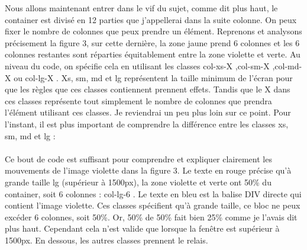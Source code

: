\documentclass{article}
\begin{document}
Nous allons maintenant entrer dans le vif du sujet, comme dit plus haut, le container est divis\'e en 12 parties que j'appellerai dans la suite colonne. On peux fixer le nombre de colonnes que peux prendre un \'el\'ement. Reprenons et analysons pr\'ecisement la figure 3, sur cette derni\`ere, la zone jaune prend 6 colonnes et les 6 colonnes restantes sont r\'eparties \'equitablement entre la zone violette et verte. Au niveau du code, on sp\'ecifie cela en utilisant les classes \og col-xs-X \fg,\og col-sm-X \fg,\og col-md-X \fg ou \og col-lg-X \fg. Xs, sm, md et lg repr\'esentent la taille minimum de l'\'ecran pour que les r\`egles que ces classes contiennent prennent effets. Tandis que le X dans ces classes repr\'esente tout simplement le nombre de colonnes que prendra l'\'el\'ement utilisant ces classes. Je reviendrai un peu plus loin sur ce point. Pour l'instant, il est plus important de comprendre la diff\'erence entre les classes xs, sm, md et lg :
\vspace{0.5cm}\\
\vspace{0.5cm}\\
Ce bout de code est suffisant pour comprendre et expliquer clairement les mouvements de l'image violette dans la figure 3. Le texte en rouge pr\'ecise qu'\`a grande taille lg (sup\'erieur \`a 1500px), la zone violette et verte ont 50\% du container, soit 6 colonnes : \og col-lg-6 \fg{} . Le texte en bleu est la balise DIV directe qui contient l'image violette. Ces classes sp\'ecifient qu'\`a grande taille, ce bloc ne peux exc\'eder 6 colonnes, soit 50\%. Or, 50\% de 50\% fait bien 25\% comme je l'avais dit plus haut. Cependant cela n'est valide que lorsque la fen\^etre est sup\'erieur \`a 1500px. En dessous, les autres classes prennent le relais.\\ 
\end{document}
